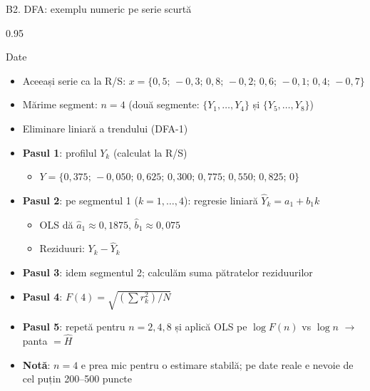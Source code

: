 \documentclass[9pt, aspectratio=169, t]{beamer}
\begin{document}
\begin{frame}[shrink=15]{B2. DFA: exemplu numeric pe serie scurtă}
\begin{cminipage}{0.95\textwidth}
\begin{exampleblock}{Date}
\begin{itemize}\setlength{\itemsep}{0pt}
    \item Aceeași serie ca la R/S: $x=\{0{,}5;\,-0{,}3;\,0{,}8;\,-0{,}2;\,0{,}6;\,-0{,}1;\,0{,}4;\,-0{,}7\}$
    \item Mărime segment: $n=4$ (două segmente: $\{Y_1,\ldots,Y_4\}$ și $\{Y_5,\ldots,Y_8\}$)
    \item Eliminare liniară a trendului (DFA-1)
\end{itemize}
\end{exampleblock}
\begin{itemize}\setlength{\itemsep}{0pt}
    \item \textbf{Pasul 1}: profilul $Y_k$ (calculat la R/S)
    \begin{itemize}\setlength{\itemsep}{0pt}
        \item $Y=\{0{,}375;\,-0{,}050;\,0{,}625;\,0{,}300;\,0{,}775;\,0{,}550;\,0{,}825;\,0\}$
    \end{itemize}
    \item \textbf{Pasul 2}: pe segmentul 1 ($k=1,\ldots,4$): regresie liniară $\hat Y_k=a_1+b_1 k$
    \begin{itemize}\setlength{\itemsep}{0pt}
        \item OLS dă $\hat a_1\approx 0{,}1875$, $\hat b_1\approx 0{,}075$
        \item Reziduuri: $Y_k-\hat Y_k$
    \end{itemize}
    \item \textbf{Pasul 3}: idem segmentul 2; calculăm suma pătratelor reziduurilor
    \item \textbf{Pasul 4}: $F(4)=\sqrt{(\sum r_k^2)/N}$
    \item \textbf{Pasul 5}: repetă pentru $n=2,4,8$ și aplică OLS pe $\log F(n)$ vs $\log n$ $\to$ panta $=\hat H$
    \item \textbf{Notă}: $n=4$ e prea mic pentru o estimare stabilă; pe date reale e nevoie de cel puțin 200--500 puncte
\end{itemize}
\end{cminipage}
\end{frame}
\end{document}
